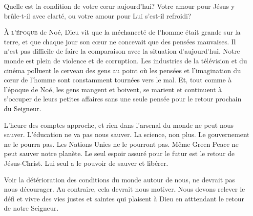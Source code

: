 Quelle est la condition de votre c\oe{}ur aujourd'hui?
 Votre amour pour Jésus y brûle-t-il avec clarté,
 ou votre amour pour Lui s'est-il refroidi? 

\dvrule







\lettrine{À}{ l'époque} de Noé, Dieu vit que la méchanceté de l'homme
 était grande sur la terre, et que chaque jour son c\oe{}ur ne concevait
 que des pensées mauvaises. Il n'est pas difficile de faire
 la comparaison avec la situation d'aujourd'hui. Notre monde est plein
 de violence et de corruption. Les industries de la télévision
 et du cinéma polluent le cerveau des gens au point où les pensées
 et l'imagination du c\oe{}ur de l'homme sont constamment
 tournées vers le mal. Et, tout comme à l'époque de Noé,
 les gens mangent et boivent, se marient et continuent
 à s'occuper de leurs petites affaires sans une seule pensée
 pour le retour prochain du Seigneur. 


L'heure des comptes approche, et rien dans l'arsenal du monde
 ne peut nous sauver. L'éducation ne va pas nous sauver.
 La science, non plus. Le gouvernement ne le pourra pas.
 Les Nations Unies ne le pourront pas. Même Green Peace
 ne peut sauver notre planète. Le seul espoir assuré pour le futur
 est le retour de Jésus-Christ.
 Lui seul a le pouvoir de sauver et libérer. 

Voir la détérioration des conditions du monde autour de nous,
 ne devrait pas nous décourager. Au contraire, cela devrait nous motiver.
 Nous devons relever le défi et vivre des vies justes et saintes
 qui plaisent à Dieu en atttendant le retour de notre Seigneur. 

\dvrule



